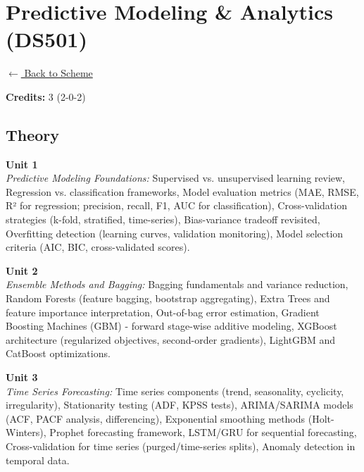 \section*{Predictive Modeling \& Analytics (DS501)}
\label{major:DS_5}

\noindent \small{\hyperref[main:scheme]{$\leftarrow$ Back to Scheme}} \vspace{0.5cm}

\noindent \textbf{Credits:} 3 (2-0-2)

\subsection*{Theory}
\noindent\textbf{Unit 1} \\
\textit{Predictive Modeling Foundations:} Supervised vs. unsupervised learning review, Regression vs. classification frameworks, Model evaluation metrics (MAE, RMSE, R² for regression; precision, recall, F1, AUC for classification), Cross-validation strategies (k-fold, stratified, time-series), Bias-variance tradeoff revisited, Overfitting detection (learning curves, validation monitoring), Model selection criteria (AIC, BIC, cross-validated scores).

\vspace{0.3cm}

\noindent\textbf{Unit 2} \\
\textit{Ensemble Methods and Bagging:} Bagging fundamentals and variance reduction, Random Forests (feature bagging, bootstrap aggregating), Extra Trees and feature importance interpretation, Out-of-bag error estimation, Gradient Boosting Machines (GBM) - forward stage-wise additive modeling, XGBoost architecture (regularized objectives, second-order gradients), LightGBM and CatBoost optimizations.

\vspace{0.3cm}

\noindent\textbf{Unit 3} \\
\textit{Time Series Forecasting:} Time series components (trend, seasonality, cyclicity, irregularity), Stationarity testing (ADF, KPSS tests), ARIMA/SARIMA models (ACF, PACF analysis, differencing), Exponential smoothing methods (Holt-Winters), Prophet forecasting framework, LSTM/GRU for sequential forecasting, Cross-validation for time series (purged/time-series splits), Anomaly detection in temporal data.

\vspace{0.3cm}

